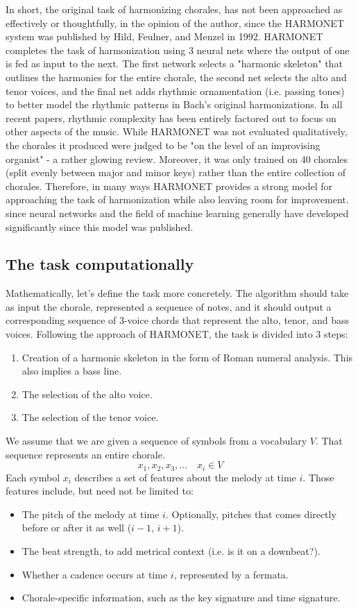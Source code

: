 \documentclass[12pt]{article}
\begin{document}
In short, the original task of harmonizing chorales, has not been approached as effectively or thoughtfully, in the opinion of the author, since the HARMONET system was published by Hild, Feulner, and Menzel in 1992. HARMONET completes the task of harmonization using 3 neural nets where the output of one is fed as input to the next. The first network selects a "harmonic skeleton" that outlines the harmonies for the entire chorale, the second net selects the alto and tenor voices, and the final net adds rhythmic ornamentation (i.e. passing tones) to better model the rhythmic patterns in Bach's original harmonizations. In all recent papers, rhythmic complexity has been entirely factored out to focus on other aspects of the music. While HARMONET was not evaluated qualitatively, the chorales it produced were judged to be "on the level of an improvising organist" - a rather glowing review. Moreover, it was only trained on 40 chorales (split evenly between major and minor keys) rather than the entire collection of chorales. Therefore, in many ways HARMONET provides a strong model for approaching the task of harmonization while also leaving room for improvement. since neural networks and the field of machine learning generally have developed significantly since this model was published.

\subsection{The task computationally}

Mathematically, let's define the task more concretely. The algorithm should take as input the chorale, represented a sequence of notes, and it should output a corresponding sequence of 3-voice chords that represent the alto, tenor, and bass voices. Following the approach of HARMONET, the task is divided into 3 steps:
\begin{enumerate}
\item Creation of a harmonic skeleton in the form of Roman numeral analysis. This also implies a bass line.
\item The selection of the alto voice.
\item The selection of the tenor voice.
\end{enumerate}
We assume that we are given a sequence of symbols from a vocabulary $V$. That sequence represents an entire chorale.
$$x_1, x_2, x_3, \ldots \quad x_i \in V$$
Each symbol $x_i$ describes a set of features about the melody at time $i$. Those features include, but need not be limited to:
\begin{itemize}
\item The pitch of the melody at time $i$. Optionally, pitches that comes directly before or after it as well ($i-1$, $i+1$).
\item The beat strength, to add metrical context (i.e. is it on a downbeat?).
\item Whether a cadence occurs at time $i$, represented by a fermata.
\item Chorale-specific information, such as the key signature and time signature.
\end{itemize}
\end{document}

